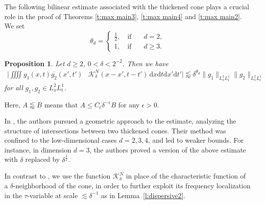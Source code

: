 \documentclass[a4paper]{amsart}
\numberwithin{figure}{section}
\numberwithin{equation}{section}%
\theoremstyle{plain}%
\newtheorem{proposition}[theorem]{Proposition}
\theoremstyle{definition}
\theoremstyle{remark}%
\def\d{\mathrm{d}}
\begin{document}
The following bilinear estimate associated with the thickened cone plays a crucial role in the proof of Theorems \ref{t:max main3}, \ref{t:max main4} and    \ref{t:max main2}. 
We set 
\[
\theta_d=\begin{cases}
\frac 12, \quad \text{if} &\quad d=2,\\
1, \quad \text{if} &\quad d\ge3.
\end{cases}
\]
\begin{proposition}\label{p:bilinear}
Let $d\geq2$,  $0<\delta<2^{-2}$. 
Then we have  
\begin{align*}
\Big| \iiiint g_1(x,t) \overline{g_2}(x',t') &\mathcal K_\delta^N (x-x',t-t')\,\d x\d t\d x'\d t' \Big|
\lessapprox
\delta^{\theta_d}
\|g_1\|_{L_x^2L_t^1}\|g_2\|_{L_x^2L_t^1}
\end{align*}
for all $g_1, g_2 \in L_x^2L_t^1$.
\end{proposition}
Here, $A\lessapprox B$ means that  $A\le C_\epsilon \delta^{-\epsilon}B$ for any $\epsilon>0$. 


In \cite{KKS}, the authors pursued a geometric approach to the estimate, analyzing the structure of intersections between two thickened cones. Their method was confined to the low-dimensional cases $d=2,3,4$, and led to weaker bounds. For instance, in dimension $d=3$, the authors proved a version of the above estimate with $\delta$ replaced by $\delta^\frac12$.

In contrast to \cite{KKS}, we use the function $\mathcal K_\delta^N$ in place of the characteristic function of a $\delta$-neighborhood of the cone, in order to further exploit its frequency localization in the $\tau$-variable at scale $\lesssim \delta^{-1}$ as in Lemma~\ref{l:dispersive2}. 
\end{document}
